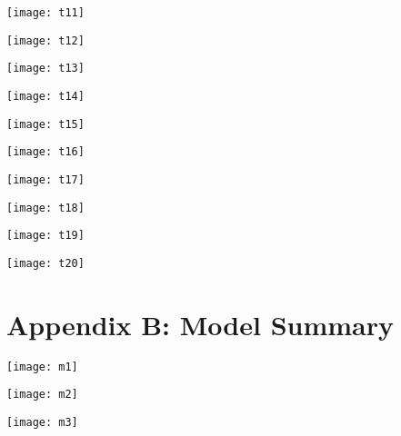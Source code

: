 \documentclass[12pt,twoside]{reedthesis}
\begin{document}
  \begin{center}\texttt{[image: t11]} \end{center}
  
  \begin{center}\texttt{[image: t12]} \end{center}
  
  \begin{center}\texttt{[image: t13]} \end{center}
  
  \begin{center}\texttt{[image: t14]} \end{center}
  
  \begin{center}\texttt{[image: t15]} \end{center}
  
  \begin{center}\texttt{[image: t16]} \end{center}
  
  \begin{center}\texttt{[image: t17]} \end{center}
  
  \begin{center}\texttt{[image: t18]} \end{center}
  
  \begin{center}\texttt{[image: t19]} \end{center}
  
  \begin{center}\texttt{[image: t20]} \end{center}
  
  \chapter{Appendix B: Model Summary}\label{appendix-b-model-summary}
  
  \begin{center}\texttt{[image: m1]} \end{center}
  
  \begin{center}\texttt{[image: m2]} \end{center}
  
  \begin{center}\texttt{[image: m3]} \end{center}
  
\end{document}
